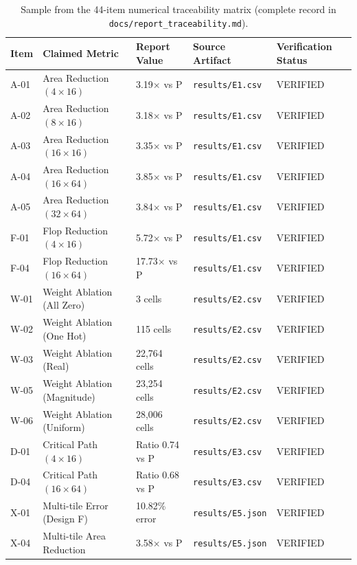 \documentclass[11pt,a4paper]{article}
\begin{document}
\begin{table}[h!]
\centering
\scriptsize
\caption{Sample from the 44-item numerical traceability matrix (complete record in \texttt{docs/report\_traceability.md}).}
\label{tab:traceability}
\begin{tabularx}{\linewidth}{lllXl}
\toprule
\textbf{Item} & \textbf{Claimed Metric} & \textbf{Report Value} & \textbf{Source Artifact} & \textbf{Verification Status} \\
\midrule
A-01 & Area Reduction $(4 \times 16)$  & 3.19$\times$ vs P & \texttt{results/E1.csv} & VERIFIED \\
A-02 & Area Reduction $(8 \times 16)$  & 3.18$\times$ vs P & \texttt{results/E1.csv} & VERIFIED \\
A-03 & Area Reduction $(16 \times 16)$ & 3.35$\times$ vs P & \texttt{results/E1.csv} & VERIFIED \\
A-04 & Area Reduction $(16 \times 64)$ & 3.85$\times$ vs P & \texttt{results/E1.csv} & VERIFIED \\
A-05 & Area Reduction $(32 \times 64)$ & 3.84$\times$ vs P & \texttt{results/E1.csv} & VERIFIED \\
F-01 & Flop Reduction $(4 \times 16)$  & 5.72$\times$ vs P & \texttt{results/E1.csv} & VERIFIED \\
F-04 & Flop Reduction $(16 \times 64)$ & 17.73$\times$ vs P & \texttt{results/E1.csv} & VERIFIED \\
W-01 & Weight Ablation (All Zero)      & 3 cells & \texttt{results/E2.csv} & VERIFIED \\
W-02 & Weight Ablation (One Hot)       & 115 cells & \texttt{results/E2.csv} & VERIFIED \\
W-03 & Weight Ablation (Real)          & 22,764 cells & \texttt{results/E2.csv} & VERIFIED \\
W-05 & Weight Ablation (Magnitude)     & 23,254 cells & \texttt{results/E2.csv} & VERIFIED \\
W-06 & Weight Ablation (Uniform)       & 28,006 cells & \texttt{results/E2.csv} & VERIFIED \\
D-01 & Critical Path $(4 \times 16)$   & Ratio 0.74 vs P & \texttt{results/E3.csv} & VERIFIED \\
D-04 & Critical Path $(16 \times 64)$  & Ratio 0.68 vs P & \texttt{results/E3.csv} & VERIFIED \\
X-01 & Multi-tile Error (Design F)     & 10.82\% error & \texttt{results/E5.json} & VERIFIED \\
X-04 & Multi-tile Area Reduction       & 3.58$\times$ vs P & \texttt{results/E5.json} & VERIFIED \\

\end{tabularx}
\end{table}
\end{document}
